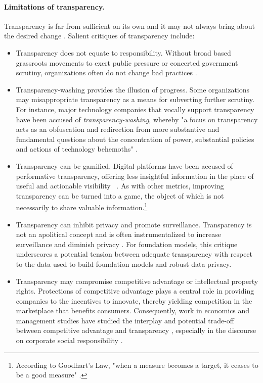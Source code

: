 \paragraph{Limitations of transparency.} 
Transparency is far from sufficient on its own and it may not always bring about the desired change \citep{corbett2023interrogating}. 
Salient critiques of transparency include:
\begin{itemize}\itemsep0em
    \item Transparency does not equate to responsibility. Without broad based grassroots movements to exert public pressure or concerted government scrutiny, organizations often do not change bad practices \citep{boyd2016algorithmic,ananny2016limits}.
    \item Transparency-washing provides the illusion of progress. 
    Some organizations may misappropriate transparency as a means for subverting further scrutiny. 
    For instance, major technology companies that vocally support transparency have been accused of \emph{transparency-washing}, whereby "a focus on transparency acts as an obfuscation and redirection from more substantive and fundamental questions about the concentration of power, substantial policies and actions of technology behemoths" \citep{zalnieriute2021transparency}.
    \item Transparency can be gamified. Digital platforms have been accused of performative transparency, offering less insightful information in the place of useful and actionable visibility ~\citep{doi:10.1177/20539517231164119, Mittelstadt2019}. 
    As with other metrics, improving transparency can be turned into a game, the object of which is not necessarily to share valuable information.\footnote{According to Goodhart's Law, "when a measure becomes a target, it ceases to be a good measure" \citep{goodhart1984problems}.}
    \item Transparency can inhibit privacy and promote surveillance. 
    Transparency is not an apolitical concept and is often instrumentalized to increase surveillance and diminish privacy \citep{han2015transparency,Mohamed2020,birchall2021radical}. 
    For foundation models, this critique underscores a potential tension between adequate transparency with respect to the data used to build foundation models and robust data privacy.
    \item Transparency may compromise competitive advantage or intellectual property rights.
    Protections of competitive advantage plays a central role in providing companies to the incentives to innovate, thereby yielding competition in the marketplace that benefits consumers.
    Consequently, work in economics and management studies have studied the interplay and potential trade-off between competitive advantage and transparency \citep{bloomfield1999market, granados2013transparency, liu2023competitive}, especially in the discourse on corporate social responsibility \citep{}.
\end{itemize}

